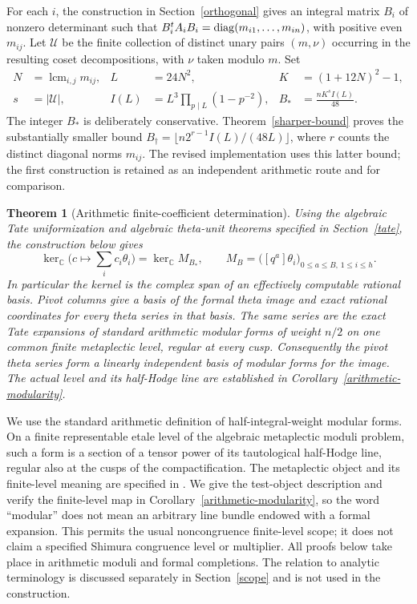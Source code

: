 \documentclass[11pt]{article}
\newtheorem{theorem}{Theorem}[section]
\theoremstyle{remark}\newtheorem{remark}[theorem]{Remark}
\newcommand{\C}{\mathbb C}\newcommand{\OO}{\mathcal O}
\DeclareMathOperator{\lcm}{lcm}
\begin{document}
For each $i$, the construction in Section~\ref{orthogonal} gives an integral
matrix $B_i$ of nonzero determinant such that
$B_i^tA_iB_i=\operatorname{diag}(m_{i1},\ldots,m_{in})$, with positive even $m_{ij}$.
Let $\mathcal U$ be the finite collection of distinct unary pairs $(m,\nu)$
occurring in the resulting coset decompositions, with $\nu$ taken modulo $m$.
Set
\begin{align*}
 N&=\lcm_{i,j}m_{ij},& L&=24N^2,& K&=(1+12N)^2-1,\\
 s&=|\mathcal U|,& I(L)&=L^3\prod_{p\mid L}(1-p^{-2}),&
 B_*&=\frac{nK^s I(L)}{48}.
\end{align*}
The integer $B_*$ is deliberately conservative.
Theorem~\ref{sharper-bound} proves the substantially smaller bound
$B_\dagger=\lfloor n2^{r-1}I(L)/(48L)\rfloor$, where $r$ counts
the distinct diagonal norms $m_{ij}$. The revised implementation uses
this latter bound; the first construction is retained as an independent
arithmetic route and for comparison.

\begin{theorem}[Arithmetic finite-coefficient determination]\label{main}
Using the algebraic Tate uniformization and algebraic theta-unit theorems
specified in Section~\ref{tate}, the construction below gives
\[
 \ker_{\C}\bigl(c\longmapsto\textstyle\sum_i c_i\theta_i\bigr)
 =\ker_{\C} M_{B_*},\qquad
 M_B=\bigl([q^a]\theta_i\bigr)_{0\leq a\leq B,\,1\leq i\leq h}.
\]
In particular the kernel is the complex span of an effectively computable
rational basis. Pivot columns give a basis of the formal theta image and
exact rational coordinates for every theta series in that basis.
The same series are the exact Tate expansions of standard arithmetic
modular forms of weight $n/2$ on one common finite metaplectic level,
regular at every cusp. Consequently the pivot theta series form a
linearly independent basis of modular forms for the image. The actual
level and its half-Hodge line are established in
Corollary~\ref{arithmetic-modularity}.
\end{theorem}

We use the standard arithmetic definition of half-integral-weight
modular forms. On a finite representable etale level of the algebraic
metaplectic moduli problem, such a form is a section of a tensor power
of its tautological half-Hodge line, regular also at the cusps of the
compactification. The metaplectic object and its finite-level meaning
are specified in \cite[Definition 3.1.1 and Remark 3.1.2]{candelori}.
We give the test-object description and verify the finite-level map in
Corollary~\ref{arithmetic-modularity}, so the word ``modular'' does not
mean an arbitrary line bundle endowed with a formal expansion.
This permits the usual noncongruence finite-level scope; it does not
claim a specified Shimura congruence level or multiplier. All proofs
below take place in arithmetic moduli and formal completions. The
relation to analytic terminology is discussed separately in
Section~\ref{scope} and is not used in the construction.
\end{document}
